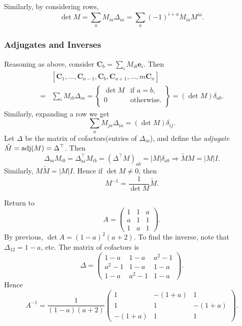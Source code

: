 \documentclass[a4paper]{article}
\begin{document}
    Similarly, by considering rows,
    \[
      \det M = \sum_{a}M_{ia}\Delta_{ia}=\sum_{a}(-1)^{i+a}M_{ia}M^{ia}
    .\]
    \subsubsection{Adjugates and Inverses}
    Reasoning as above, consider $ \mathbf{C}_b=\sum_i
    M_{ib}\mathbf{e}_i $. Then
    \[
      \begin{aligned}
        &[\mathbf{C}_1,\dots,\mathbf{C}_{a-1},\mathbf{C}_b,\mathbf{C}_{a+1},\dots,m\mathbf{C}_n]\\
        =&\sum_{i}M_{ib}\Delta_{ia}=\left.
        \begin{cases}
          \det M &\text{if }a=b,\\
          0 &\text{otherwise.}\\
        \end{cases}\right\rbrace  = (\det M )\delta_{ab}.
      \end{aligned}
    \]
    Similarly, expanding a row we get
    \[
      \sum_{a}M_{ja}\Delta_{ia} = (\det M)\delta_{ij}
    .\]
    Let $ \Delta $ be the matrix of cofactors(entries of
    $\Delta_{ia}$), and define the \textit{adjugate} $
    \tilde{M}=\operatorname{adj}(M) = \Delta^{\top} $. Then
    \[
      \Delta_{ia}M_{ib}=\Delta^{\top}_{ai}M_{ib}=(\Delta^{\top}
      M)_{ab}=|M| \delta_{ab} \Longrightarrow \tilde{M}M=|M|I
    .\]
    Similarly, $ M \tilde{M}=|M|I $. Hence if $ \det M\neq 0 $, then
    \[
      M^{-1}=\frac{1}{\det M}\tilde{M}
    .\]
    \begin{example}
      Return to
      \[
        A=
        \begin{pmatrix}
          1&1&a\\
          a&1&1\\
          1&a&1
        \end{pmatrix}
      .\]
      By previous, $ \det A=(1-a)^2(a+2) $. To find the inverse, note
      that $ \Delta_{12}=1-a $, etc. The matrix of cofactors is
      \[
        \Delta=
        \begin{pmatrix}
          1-a&1-a&a^2-1\\
          a^2-1&1-a&1-a\\
          1-a&a^2-1&1-a
        \end{pmatrix}
      .\]
      Hence
      \[
        A^{-1}=\frac{1}{(1-a)(a+2)}
        \begin{pmatrix}
          1&-(1+a) & 1 \\
          1 & 1&-(1+a) \\
          -(1+a)& 1 & 1
        \end{pmatrix}
      .\]
    \end{example}
\end{document}
